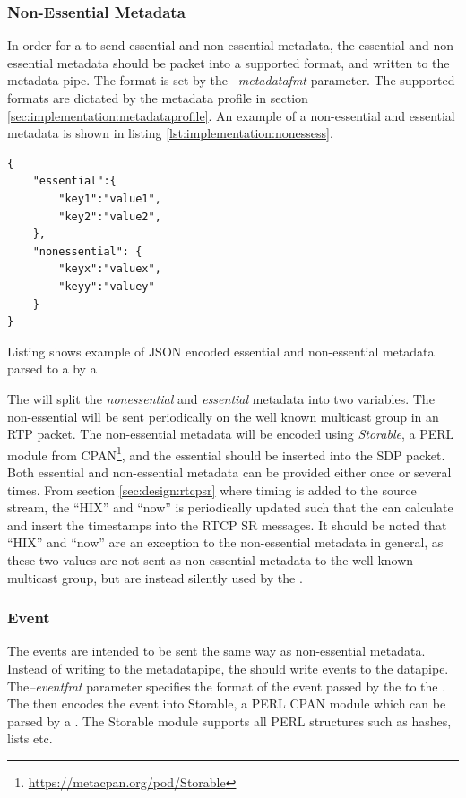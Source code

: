 \subsubsection{Non-Essential Metadata} \label{sec:implementation:nonemd:pub}
In order for a \pro{} to send essential and non-essential metadata, the essential and non-essential metadata should be packet into a supported format, and written to the metadata pipe. The format is set by the \textit{--metadatafmt} parameter. The supported formats are dictated by the metadata profile in section \ref{sec:implementation:metadataprofile}. An example of a non-essential and essential metadata is shown in listing \ref{lst:implementation:nonessess}.

\begin{listing}[H] 
\begin{verbatim}
{
	"essential":{
		"key1":"value1",
		"key2":"value2",
	},
	"nonessential": {
		"keyx":"valuex",
		"keyy":"valuey"
	}
}
\end{verbatim}
\caption{Listing shows example of JSON encoded essential and non-essential metadata parsed to a \pub{} by a \con{}}
\label{lst:implementation:nonessess}
\end{listing}

The \pub{} will split the \textit{nonessential} and \textit{essential} metadata into two variables. The non-essential will be sent periodically on the well known multicast group in an RTP packet.
The non-essential metadata will be encoded using \textit{Storable}, a PERL module from CPAN\footnote{\url{https://metacpan.org/pod/Storable}}, and the essential should be inserted into the SDP packet.
Both essential and non-essential metadata can be provided either once or several times.  From section \ref{sec:design:rtcpsr} where timing is added to the source stream, the ``HIX'' and ``now'' is periodically updated such that the \pub{} can calculate and insert the timestamps into the RTCP SR messages.
It should be noted that ``HIX'' and ``now'' are an exception to the non-essential metadata in general, as these two values are not sent as non-essential metadata to the well known multicast group, but are instead silently used by the \pub{}.

\subsubsection{Event} \label{sec:implementation:events:pub}
The events are intended to be sent the same way as non-essential metadata. Instead of writing to the metadatapipe, the \pro{} should write events to the datapipe. The\textit{--eventfmt} parameter specifies the format of the event passed by the \pro{} to the \pub{}. The \pub{} then encodes the event into Storable, a PERL CPAN module which can be parsed by a \sub{}. The Storable module supports all PERL structures such as hashes, lists etc.


